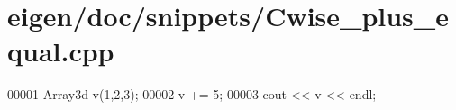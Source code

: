 \hypertarget{eigen_2doc_2snippets_2_cwise__plus__equal_8cpp_source}{}\section{eigen/doc/snippets/\+Cwise\+\_\+plus\+\_\+equal.cpp}
\label{eigen_2doc_2snippets_2_cwise__plus__equal_8cpp_source}

\begin{DoxyCode}
00001 Array3d v(1,2,3);
00002 v += 5;
00003 cout << v << endl;
\end{DoxyCode}
